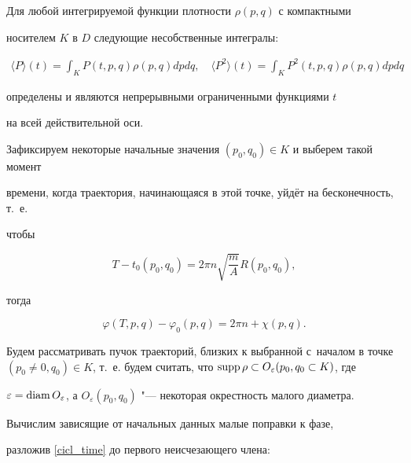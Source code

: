 
\begin{theorem}

 Для любой интегрируемой функции плотности $\rho(p,q)$ с компактными

 носителем $K$ в $D$ следующие несобственные интегралы:

 \begin{gather}

 \langle P\rangle(t) = \int_{K} P(t,p,q)\rho(p,q)d p dq, 

 \quad 

 \langle P^2\rangle(t) = \int_{K} P^2(t,p,q)\rho(p,q)d p dq

 \end{gather}

 определены и являются непрерывными   ограниченными функциями $t$

 на всей действительной оси{\rm .}

\end{theorem}



\smallskip



 Зафиксируем   некоторые начальные значения $(p_0, q_0)\in K$  и выберем такой момент

 времени, когда траектория, начинающаяся в этой точке, уйдёт на  бесконечность, т.~е.

 чтобы

$$

T- t_0(p_0, q_0)=2\pi n\sqrt{\frac{m}{A}}R(p_0, q_0),

$$

тогда

$$

\varphi(T,p,q) -\varphi_0(p,q) = 2\pi n +\chi(p,q).

$$

Будем рассматривать пучок траекторий, близких   к  выбранной  с~началом в точке $(p_0\neq 0, q_0)\in K$, т.~е. будем считать, что $ \mathop{\rm supp}\rho \subset O_{\varepsilon}(p_0, q_0\subset K)$,  где

$\varepsilon =

 \mathop{\rm diam} O_{\varepsilon}$, а $ O_{\varepsilon}(p_0, q_0)$ "--- некоторая  окрестность малого диаметра.

  Вычислим зависящие от начальных данных малые поправки к фазе,

  разложив \eqref{cicl_time} до первого неисчезающего члена:


